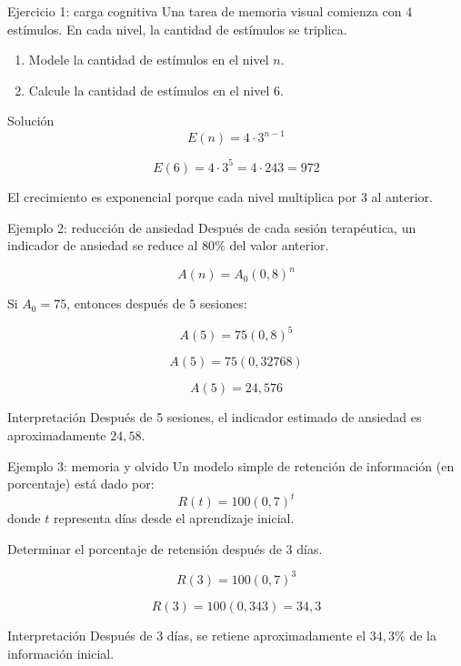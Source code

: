 \documentclass[aspectratio=169]{beamer}
\begin{document}
	\begin{frame}{Ejercicio 1: carga cognitiva}
		Una tarea de memoria visual comienza con \(4\) estímulos. En cada nivel, la cantidad de estímulos se triplica.
		
		\begin{enumerate}
			\item Modele la cantidad de estímulos en el nivel \(n\).
			\item Calcule la cantidad de estímulos en el nivel \(6\).
		\end{enumerate}
		
		\pause
		
		\begin{block}{Solución}
			\[
			E(n)=4\cdot 3^{n-1}
			\]
			
			\[
			E(6)=4\cdot 3^5=4\cdot 243=972
			\]
			
			El crecimiento es exponencial porque cada nivel multiplica por \(3\) al anterior.
		\end{block}
	\end{frame}
	
	\begin{frame}{Ejemplo 2: reducción de ansiedad}
		Después de cada sesión terapéutica, un indicador de ansiedad se reduce al \(80\%\) del valor anterior.
		
		\[
		A(n)=A_0(0{,}8)^n
		\]
		
		Si \(A_0=75\), entonces después de \(5\) sesiones:
		
		\[
		A(5)=75(0{,}8)^5
		\]
		
		\[
		A(5)=75(0{,}32768)
		\]
		
		\[
		A(5)=24{,}576
		\]
		
		\begin{block}{Interpretación}
			Después de 5 sesiones, el indicador estimado de ansiedad es aproximadamente \(24{,}58\).
		\end{block}
	\end{frame}
	
	
	\begin{frame}{Ejemplo 3: memoria y olvido}
		Un modelo simple de retención de información (en porcentaje) está dado por:
		\[
		R(t)=100(0{,}7)^t
		\]
		donde \(t\) representa días desde el aprendizaje inicial.
		
		Determinar el porcentaje de retensión después de 3 días.
		
		\[
		R(3)=100(0{,}7)^3
		\]
		
		\[
		R(3)=100(0{,}343)=34{,}3
		\]
		
		\begin{block}{Interpretación}
			Después de 3 días, se retiene aproximadamente el \(34{,}3\%\) de la información inicial.
		\end{block}
	\end{frame}
	
\end{document}
